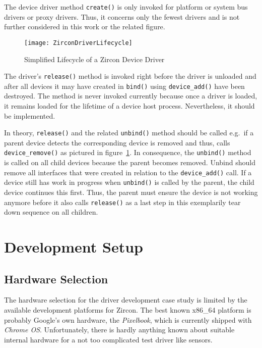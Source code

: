 The device driver method \texttt{create()} is only invoked for platform or system bus drivers or proxy drivers.
Thus, it concerns only the fewest drivers and is not further considered in this work or the related figure\cite{zircon-devicemodel}.

\begin{figure} [t]
    \centering
    \texttt{[image: ZirconDriverLifecycle]}
    \caption{Simplified Lifecycle of a Zircon Device Driver}
    \label{pic:zircon-lifecycle}
\end{figure}


The driver's \texttt{release()} method is invoked right before the driver is unloaded and after all devices it may have created in \texttt{bind()} using \texttt{device\_add()} have been destroyed.
The method is never invoked currently because once a driver is loaded, it remains loaded for the lifetime of a device host process.
Nevertheless, it should be implemented.

In theory, \texttt{release()} and the related \texttt{unbind()} method should be called e.g.\ if a parent device detects the corresponding device is removed and thus, calls \texttt{device\_remove()} as pictured in figure~\ref{pic:zircon-lifecycle}.
In consequence, the \texttt{unbind()} method is called on all child devices because the parent becomes removed.
Unbind should remove all interfaces that were created in relation to the \texttt{device\_add()} call.
If a device still has work in progress when \texttt{unbind()} is called by the parent, the child device continues this first.
Thus, the parent must ensure the device is not working anymore before it also calls \texttt{release()} as a last step in this exemplarily tear down sequence on all children\cite{zircon-devicemodel}.


\section{Development Setup}
\subsection{Hardware Selection}
The hardware selection for the driver development case study is limited by the available development platforms for Zircon.
The best known x86\_64 platform is probably Google's own hardware, the \textit{Pixelbook}, which is currently shipped with \textit{Chrome OS}.
Unfortunately, there is hardly anything known about suitable internal hardware for a not too complicated test driver like sensors.

